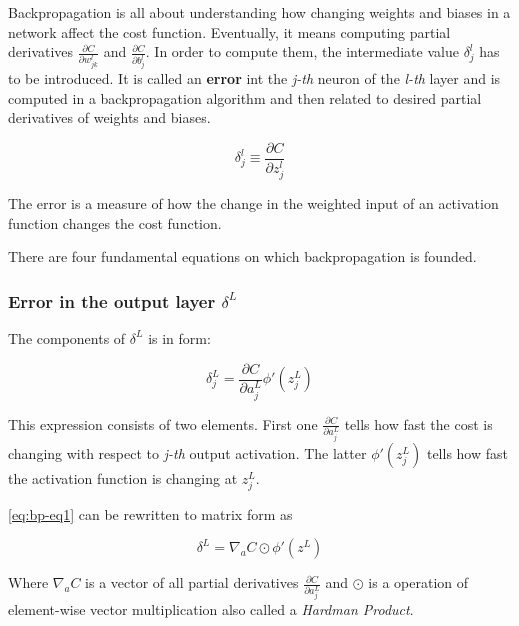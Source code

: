 \vspace{.5cm}

Backpropagation is all about understanding how changing weights and biases in a network affect the cost function. Eventually, it means computing partial derivatives $\frac{\partial C}{\partial w^l_{jk}}$ and $\frac{\partial C}{\partial b^l_j}$. In order to compute them, the intermediate value $\delta^l_j$ has to be introduced. It is called an \textbf{error} int the \emph{j-th} neuron of the \emph{l-th} layer and is computed in a backpropagation algorithm and then related to desired partial derivatives of weights and biases.

\begin{equation}
    \delta^l_j \equiv \frac{\partial C}{\partial z^l_j}
\end{equation}

The error is a measure of how the change in the weighted input of an activation function changes the cost function.

There are four fundamental equations on which backpropagation is founded.

\subsubsection*{Error in the output layer $\delta^L$}
\label{sub2:error-in-the-output-layer}

The components of $\delta^L$ is in form:

\begin{equation}
\delta^L_j = \frac{\partial C}{\partial a^L_j}\phi'(z^L_j)
\tag{EQ1}
\label{eq:bp-eq1}
\end{equation}

This expression consists of two elements. First one $\frac{\partial C}{\partial a^L_j}$ tells how fast the cost is changing with respect to \emph{j-th} output activation. The latter $\phi'(z^L_j)$ tells how fast the activation function is changing at $z^L_j$.

\ref{eq:bp-eq1} can be rewritten to matrix form as

\begin{equation}
    \delta^L = \nabla_a C \odot \phi'(z^L)
    \tag{EQ1a}
    \label{eq:bp-eq1a}
\end{equation}

Where $\nabla_a C$ is a vector of all partial derivatives $\frac{\partial C}{\partial a^L_j}$ and $\odot$ is a operation of element-wise vector multiplication also called a \emph{Hardman Product}.

